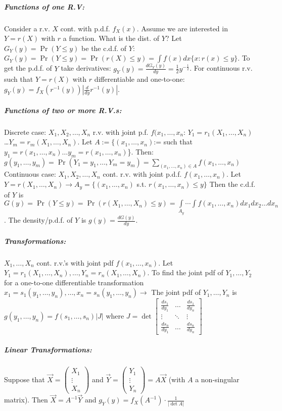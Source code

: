 \documentclass[landscape,10pt]{article}
\begin{document}
\begin{multicols}{4}
 \subparagraph*{Functions of one R.V: }
    Consider a r.v. \(X\) cont. with p.d.f. \(f_X(x)\). Assume we are interested in \(Y=r(X)\) with \(r\) a function. What is the dist. of \(Y\)? Let \(G_Y(y) = \Pr(Y \leq y)\) be the c.d.f. of \(Y\): \(G_Y(y) = \Pr(Y \leq y) = \Pr(r(X) \leq y) = \int{f(x)}dx \{x: r(x) \leq y\} \). To get the p.d.f. of \(Y\) take derivatives: \(g_Y(y) = \frac{dG_Y(y)}{dy} = \frac{1}{2} y^{-\frac{1}{2}}\). For continuous r.v. such that \(Y = r(X)\) with \(r\) differentiable and one-to-one: \(g_Y(y) = f_X(r^{-1}(y))\left|\frac{d}{dy} r^{-1} (y) \right|\).

\subparagraph*{Functions of two or more R.V.s:}
 Discrete case: \(X_1, X_2, \ldots, X_n\) r.v. with joint p.f. \(f(x_1, \ldots, x_n\):
\(Y_1 = r_1(X_1,\ldots,X_n)\) \dots \(Y_m = r_m(X_1,\ldots,X_n)\). Let \(A := \{(x_1,\ldots,x_n)\):= such that \(y_1 = r(x_1,\ldots,x_n) \dots y_m = r(x_1,\ldots,x_n)\)\}. Then: \(g(y_1,\ldots,y_m)=\Pr(Y_1=y_1,\ldots,Y_m=y_m)=\sum\limits_{(x_1,\ldots,x_n)\in A}{f(x_1,\ldots,x_n)}\) \\

Continuous case: \(X_1, X_2, \ldots, X_n\) cont. r.v. with joint p.d.f. \(f(x_1, \ldots, x_n)\). Let \(Y = r(X_1,\ldots,X_n) \rightarrow A_y = \{(x_1,\ldots,x_n)\) s.t. \(r(x_1,\ldots,x_n) \leq y\}\) Then the c.d.f. of \(Y\) is \(G(y) = \Pr(Y \leq y) = \Pr\left( r(X_1,\ldots,X_n) \leq y \right) = \int\limits_{A_y}\cdots\int{f(x_1,\ldots,x_n)}dx_1dx_2\ldots dx_n\). The density/p.d.f. of \(Y\) is \(g(y) = \frac{dG(y)}{dy}\).

\subparagraph*{Transformations: }
 \(X_1,\ldots,X_n\) cont. r.v.'s with joint pdf \(f(x_1,\ldots,x_n)\). Let \(Y_1 = r_1(X_1,\ldots,X_n), \dots, Y_n = r_n (X_1, \ldots, X_n)\). To find the joint pdf of \(Y_1, \ldots, Y_2\) for a one-to-one differentiable transformation \(x_1 = s_1 (y_1,\ldots,y_n), \dots, x_n = s_n (y_1, \ldots, y_n) \rightarrow \) The joint pdf of \(Y_1,\ldots,Y_n\) is \(g(y_1,\ldots,y_n) = f(s_1,\ldots,s_n)\left|J\right|\) where \(J = \det \begin{bmatrix}
    \frac{ds_1}{dy_1} & \dots & \frac{ds_1}{dy_n} \\
    \vdots & \ddots & \vdots \\
     \frac{ds_n}{dy_1} & \hdots & \frac{ds_n}{dy_n}
 \end{bmatrix}
 \)

 \subparagraph*{Linear Transformations: } Suppose that 
 \(\vec{X} = 
    \begin{pmatrix}
        X_1\\
        \vdots{}\\ 
        X_n
    \end{pmatrix}\) and 
\(\vec{Y} = 
    \begin{pmatrix}
        Y_1\\
        \vdots{} \\
        Y_n
    \end{pmatrix}
    = A\vec{X}\) (with \(A\) a non-singular matrix). Then \(\vec{X} = A^{-1}\vec{Y}\) and \(g_Y(y) = f_X(A^{-1})\cdot\frac{1}{\left|\det A\right|}\)




\end{multicols}
\end{document}
